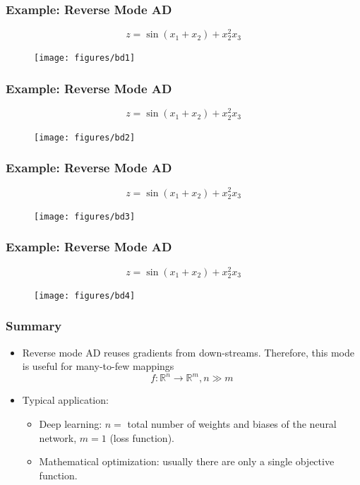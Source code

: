 \documentclass{beamer}
\begin{document}
\begin{frame}
\frametitle{Example: Reverse Mode AD}	
$$z=\sin(x_1+x_2) + x_2^2x_3$$
\begin{figure}[hbt]
\centering
  \texttt{[image: figures/bd1]}
\end{figure}

  
\end{frame}

\begin{frame}
\frametitle{Example: Reverse Mode AD}	
$$z=\sin(x_1+x_2) + x_2^2x_3$$
\begin{figure}[hbt]
\centering
  \texttt{[image: figures/bd2]}
\end{figure}
\end{frame}


\begin{frame}
\frametitle{Example: Reverse Mode AD}	
$$z=\sin(x_1+x_2) + x_2^2x_3$$
\begin{figure}[hbt]
\centering
  \texttt{[image: figures/bd3]}
\end{figure}
\end{frame}

\begin{frame}
\frametitle{Example: Reverse Mode AD}	
$$z=\sin(x_1+x_2) + x_2^2x_3$$
\begin{figure}[hbt]
\centering
  \texttt{[image: figures/bd4]}
\end{figure}
\end{frame}

\begin{frame}
	\frametitle{Summary}
	
	\begin{itemize}
		\item Reverse mode AD reuses gradients from down-streams. Therefore, this mode is useful for many-to-few mappings
		$$f:\mathbb{R}^n\rightarrow \mathbb{R}^m, n\gg m$$
		\item Typical application:
		\begin{itemize}
		\item Deep learning: $n=$ total number of weights and biases of the neural network, $m=1$ (loss function). 
		\item Mathematical optimization: usually there are only a single objective function. 
		\end{itemize}
	\end{itemize}
\end{frame}
\end{document}
